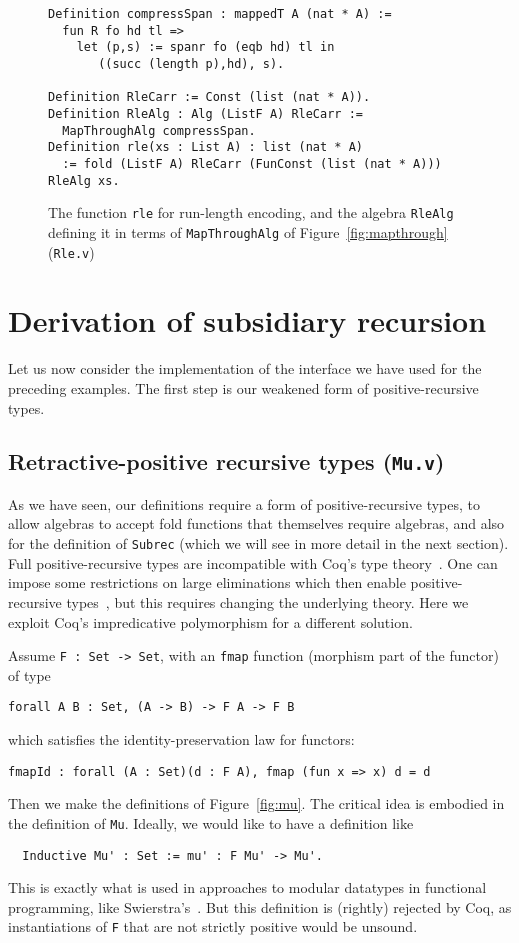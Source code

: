 \documentclass[a4paper,USenglish]{lipics-v2021}
\begin{document}
\begin{figure}
\begin{verbatim}
Definition compressSpan : mappedT A (nat * A) :=
  fun R fo hd tl =>
    let (p,s) := spanr fo (eqb hd) tl in
       ((succ (length p),hd), s).

Definition RleCarr := Const (list (nat * A)).
Definition RleAlg : Alg (ListF A) RleCarr :=
  MapThroughAlg compressSpan.
Definition rle(xs : List A) : list (nat * A)
  := fold (ListF A) RleCarr (FunConst (list (nat * A))) RleAlg xs.
\end{verbatim}
\caption{The function \texttt{rle} for run-length encoding, and the algebra \texttt{RleAlg} defining it
in terms of \texttt{MapThroughAlg} of Figure~\ref{fig:mapthrough} (\texttt{Rle.v})}
\label{fig:rle}
\end{figure}

\section{Derivation of subsidiary recursion}
\label{sec:deriv}

Let us now consider the implementation of the
interface we have used for the preceding examples.
The first step is our weakened form of positive-recursive
types.

\subsection{Retractive-positive recursive types (\texttt{Mu.v})}
\label{sec:mu}

As we have seen, our definitions require a form of positive-recursive
types, to allow algebras to accept fold functions that themselves
require algebras, and also for the definition of \verb|Subrec| (which
we will see in more detail in the next section).  Full
positive-recursive types are incompatible with Coq's type
theory~\cite{coquand88}.  One can impose some restrictions on large
eliminations which then enable positive-recursive
types~\cite{blanqui05}, but this requires changing the underlying
theory.  Here we exploit Coq's
impredicative polymorphism for a different solution.

Assume \verb|F : Set -> Set|, with an \verb|fmap| function
(morphism part of the functor) of type
\begin{verbatim}
forall A B : Set, (A -> B) -> F A -> F B
\end{verbatim}
\noindent which satisfies the identity-preservation law for functors:
\begin{verbatim}
fmapId : forall (A : Set)(d : F A), fmap (fun x => x) d = d
\end{verbatim}
\noindent Then we make the definitions of Figure~\ref{fig:mu}.  The critical
idea is embodied in the definition of \verb|Mu|.  Ideally, we would like
to have a definition like
\begin{verbatim}
  Inductive Mu' : Set := mu' : F Mu' -> Mu'.
\end{verbatim}
\noindent This is exactly what is used in approaches to modular
datatypes in functional programming, like
Swierstra's~\cite{swierstra08}.  But this definition is (rightly)
rejected by Coq, as instantiations of
\verb|F| that are not strictly positive would be unsound.
\end{document}
